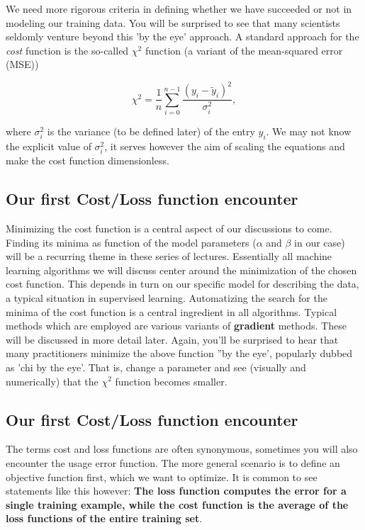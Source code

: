 \documentclass[%
oneside,                 %
final,                   %
10pt]{article}
\begin{document}
We need more rigorous criteria in defining whether we have succeeded or
not in modeling our training data.  You will be surprised to see that
many scientists seldomly venture beyond this 'by the eye' approach. A
standard approach for the \emph{cost} function is the so-called $\chi^2$
function (a variant of the mean-squared error (MSE))

\[ \chi^2 = \frac{1}{n}
\sum_{i=0}^{n-1}\frac{(y_i-\tilde{y}_i)^2}{\sigma_i^2}, 
\] 

where $\sigma_i^2$ is the variance (to be defined later) of the entry
$y_i$.  We may not know the explicit value of $\sigma_i^2$, it serves
however the aim of scaling the equations and make the cost function
dimensionless.  

\subsection{Our first Cost/Loss function encounter}

Minimizing the cost function is a central aspect of
our discussions to come. Finding its minima as function of the model
parameters ($\alpha$ and $\beta$ in our case) will be a recurring
theme in these series of lectures. Essentially all machine learning
algorithms we will discuss center around the minimization of the
chosen cost function. This depends in turn on our specific
model for describing the data, a typical situation in supervised
learning. Automatizing the search for the minima of the cost function is a
central ingredient in all algorithms. Typical methods which are
employed are various variants of \textbf{gradient} methods. These will be
discussed in more detail later. Again, you'll be surprised to hear that
many practitioners minimize the above function ''by the eye', popularly dubbed as 
'chi by the eye'. That is, change a parameter and see (visually and numerically) that 
the  $\chi^2$ function becomes smaller. 

\subsection{Our first Cost/Loss function encounter}

The terms cost and loss functions are often synonymous, sometimes you will also encounter the usage  error function.
The more general scenario is to define an objective function first, which we want to optimize.
It is common to see statements like this however: \textbf{The loss function computes the error for a single training example, while the cost function is the average of the loss functions of the entire training set}.
\end{document}
